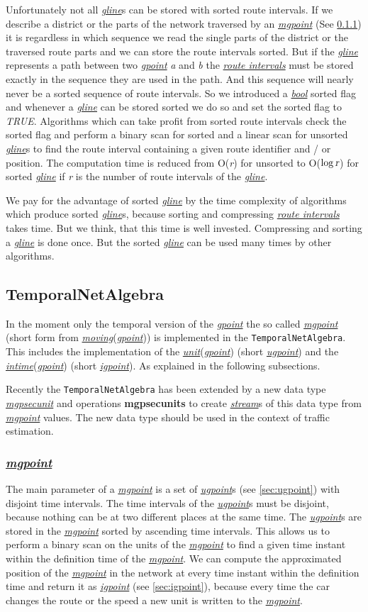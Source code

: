 \documentclass[a4paper]{article}
\newcommand{\op}[1]{\textbf{#1}}
\newcommand{\var}[1]{\textsl{#1}}
\newcommand{\dt}[1]{\textsl{\underline{#1}}}
\newcommand{\file}[1]{\texttt{#1}}
\newcommand{\true}{\var{TRUE}}
\begin{document}
Unfortunately not all \dt{gline}s can be stored with sorted route intervals. If we describe a district or the parts of the network traversed by an \dt{mgpoint} (See \ref{sec:mgpoint}) it is regardless in which sequence we read the single parts of the district or the traversed route parts and we can store the route intervals sorted. But if the \dt{gline} represents a path between two \dt{gpoint} \var{a} and \var{b} the \dt{route intervals} must be stored exactly in the sequence they are used in the path. And this sequence will nearly never be a sorted sequence of route intervals. So we introduced a \dt{bool} sorted flag and whenever a \dt{gline} can be stored sorted we do so and set the sorted flag to \true{}. Algorithms which can take profit from sorted route intervals check the sorted flag and perform a binary scan for sorted and a linear scan for unsorted \dt{gline}s to find the route interval containing a given route identifier and / or position. The computation time is reduced from O(\var{r}) for unsorted to O($\log \var{r}$) for sorted \dt{gline} if \var{r} is the number of route intervals of the \dt{gline}.

We pay for the advantage of sorted \dt{gline} by the time complexity of algorithms which produce sorted \dt{gline}s, because sorting and compressing \dt{route intervals} takes time. But we think, that this time is well invested. Compressing and sorting a \dt{gline} is done once. But the sorted \dt{gline} can be used many times by other algorithms.
\subsection{TemporalNetAlgebra}
In the moment only the temporal version of the \dt{gpoint} the so called \dt{mgpoint} (short form from \dt{moving}(\dt{gpoint})) is implemented in the \file{TemporalNetAlgebra}. This includes the implementation of the \dt{unit}(\dt{gpoint}) (short \dt{ugpoint}) and the \dt{intime}(\dt{gpoint}) (short \dt{igpoint}). As explained in the following subsections.

Recently the \file{TemporalNetAlgebra} has been extended by a new data type \dt{mgpsecunit} and operations \op{mgpsecunits} to create \dt{stream}s of this data type from \dt{mgpoint} values. The new data type should be used in the context of traffic estimation.
\subsubsection{\dt{mgpoint}}
\label{sec:mgpoint}
The main parameter of a \dt{mgpoint} is a set of \dt{ugpoint}s (see \ref{sec:ugpoint}) with disjoint time intervals. The time intervals of the \dt{ugpoint}s must be disjoint, because nothing can be at two different places at the same time. The \dt{ugpoint}s are stored in the \dt{mgpoint} sorted by ascending time intervals. This allows us to perform a binary scan on the units of the \dt{mgpoint} to find a given time instant within the definition time of the \dt{mgpoint}. We can compute the approximated position of the \dt{mgpoint} in the network at every time instant within the definition time and return it as \dt{igpoint} (see \ref{sec:igpoint}), because every time the car changes the route or the speed a new unit is written to the \dt{mgpoint}.
\end{document}
